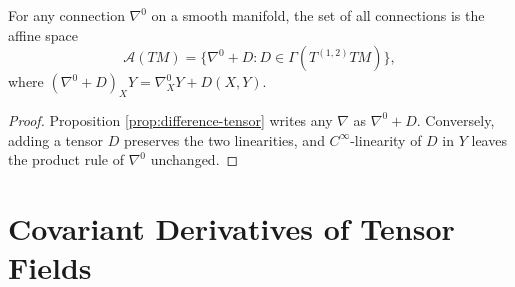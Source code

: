 \begin{theorem}
\label{thm:connections-affine-space}
\leanok
For any connection $\nabla^0$ on a smooth manifold, the set of all connections is the affine space
\[
\mathcal A(TM)=\{\nabla^0+D:D\in\Gamma(T^{(1,2)}TM)\},
\]
where $(\nabla^0+D)_XY=\nabla^0_XY+D(X,Y)$.
\end{theorem}
\begin{proof}
\leanok
{}
\sketch Proposition \ref{prop:difference-tensor} writes any $\nabla$ as $\nabla^0+D$. Conversely, adding a tensor $D$ preserves the two linearities, and $C^\infty$-linearity of $D$ in $Y$ leaves the product rule of $\nabla^0$ unchanged.
\end{proof}
\section{Covariant Derivatives of Tensor Fields}


